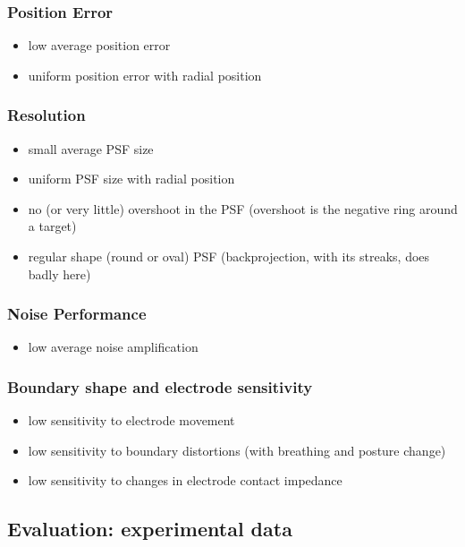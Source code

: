 \documentclass[letterpaper,twocolumn,11pt]{article}
\begin{document}
\subsubsection{Position Error}
   \begin{itemize}
   \item low average position error
   \item uniform position error with radial position
   \end{itemize}

\subsubsection{ Resolution}
   \begin{itemize}
   \item small average PSF size
   \item uniform PSF size with radial position
   \item no (or very little) overshoot in the PSF
  (overshoot is the negative ring around a target)
   \item regular shape (round or oval) PSF
  (backprojection, with its streaks, does badly here)
   \end{itemize}

\subsubsection{ Noise Performance}
   \begin{itemize}
   \item low average noise amplification
   \end{itemize}

\subsubsection{ Boundary shape and electrode sensitivity}
   \begin{itemize}
   \item low sensitivity to electrode movement
   \item low sensitivity to boundary distortions
         (with breathing and posture change)
   \item low sensitivity to changes in electrode contact impedance
   \end{itemize}


\subsection{Evaluation: experimental data}
\end{document}
